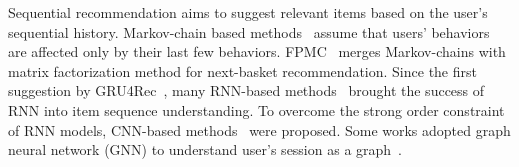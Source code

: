 
Sequential recommendation aims to suggest relevant items based on the user's sequential history. Markov-chain based methods~\cite{SIMILARITYMC, MCAULEYMC2016, TRANSREC, he2016fusing} assume that users' behaviors are affected only by their last few behaviors. FPMC~\cite{rendle2010factorizing} merges Markov-chains with matrix factorization method for next-basket recommendation. Since the first suggestion by GRU4Rec~\cite{GRU4Rec}, many RNN-based methods~\cite{hidasi2018recurrent, RNN4Rec, HIERARCHICALGRU4REC, DREAM, wu2017recurrent, wu2017sequential, DINEVOLUTION} brought the success of RNN into item sequence understanding. To overcome the strong order constraint of RNN models, CNN-based methods~\cite{CASER, CNNGENERATIVE, HIERARCHICALCNN} were proposed. Some works adopted graph neural network (GNN) to understand user's session as a graph~\cite{SESSIONGNN}.


